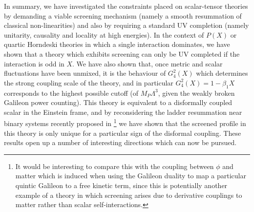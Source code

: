 \documentclass[11pt]{article}
\begin{document}
In summary, we have investigated the constraints placed on scalar-tensor theories by demanding a viable screening mechanism (namely a smooth resummation of classical non-linearities) and also by requiring a standard UV completion (namely unitarity, causality and locality at high energies). 
In the context of $P(X)$ or quartic Horndeski theories in which a single interaction dominates, we have shown that a theory which exhibits screening can only be UV completed if the interaction is odd in $X$. 
We have also shown that, once metric and scalar fluctuations have been unmixed, it is the behaviour of $G_4^2 (X)$ which determines the strong coupling scale of the theory, and in particular $G_4^2 (X) = 1 - \beta_1 X$ corresponds to the highest possible cutoff (of $M_P \Lambda^3$, given the weakly broken Galileon power counting). 
This theory is equivalent to a disformally coupled scalar in the Einstein frame, and by reconsidering the ladder resummation near binary systems recently proposed in \cite{Davis:2019ltc}\footnote{
It would be interesting to compare this with the coupling between $\phi$ and matter which is induced when using the Galileon duality \cite{deRham:2013hsa, DeRham:2014wnv} to map a particular quintic Galileon to a free kinetic term, since this is potentially another example of a theory in which screening arises due to derivative couplings to matter rather than scalar self-interactions.
} we have shown that the screened profile in this theory is only unique for a particular sign of the disformal coupling.  
These results open up a number of interesting directions which can now be pursued. 

\end{document}
